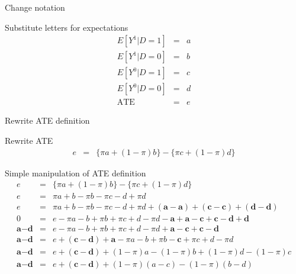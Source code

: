 \documentclass{beamer}
\begin{document}
\begin{frame}{Change notation}



  \begin{block}{Substitute letters for expectations}
    \begin{eqnarray*}
      E[Y^1|D=1] &=& a  \\
      E[Y^1|D=0] &=& b  \\
      E[Y^0|D=1] &=& c  \\
      E[Y^0|D=0] &=& d  \\
      \text{ATE} &=& e
    \end{eqnarray*}
  \end{block}
  



\end{frame}

\begin{frame}{Rewrite ATE definition}


  \begin{block}{Rewrite ATE}
    \begin{eqnarray*}
      e&=&\{\pi{a} + (1-\pi)b\} - \{\pi{c} + (1-\pi)d\}
    \end{eqnarray*}
  \end{block}

\end{frame}




\begin{frame}[plain]

  \begin{block}{Simple manipulation of ATE definition}
    \begin{eqnarray*}
      e&=&\{\pi{a} + (1-\pi)b\} - \{\pi{c} + (1-\pi)d\}  \\
      e&=&\pi{a} + b - \pi{b} - \pi{c} - d + \pi{d}  \\
      e&=&\pi{a} + b - \pi{b} - \pi{c} - d + \pi{d} + (\textbf{a} - \textbf{a}) + (\textbf{c} - \textbf{c}) + (\textbf{d} - \textbf{d})  \\
      0&=&e-\pi{a} - b + \pi{b} + \pi{c} + d - \pi{d} - \textbf{a} + \textbf{a} - \textbf{c} + \textbf{c} - \textbf{d} + \textbf{d}  \\
      \textbf{a}-\textbf{d}&=&e-\pi{a} - b + \pi{b} + \pi{c} + d - \pi{d}  + \textbf{a} - \textbf{c} + \textbf{c} - \textbf{d}  \\
      \textbf{a}-\textbf{d}&=&e  + (\textbf{c} - \textbf{d}) + \textbf{a}-\pi{a} - b + \pi{b} - \textbf{c} + \pi{c} + d - \pi{d} \\
      \textbf{a}-\textbf{d}&=&e  + (\textbf{c} - \textbf{d}) + (1-\pi)a -(1-\pi)b + (1-\pi)d - (1-\pi)c  \\
      \textbf{a}-\textbf{d}&=&e  + (\textbf{c} - \textbf{d}) + (1-\pi)(a-c) -(1-\pi)(b-d)
    \end{eqnarray*}
  \end{block}


\end{frame}
\end{document}
